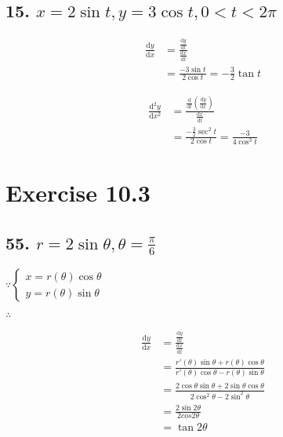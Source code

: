 \documentclass{article}
\begin{document}
    \subsection*{15. $x = 2\sin t, y = 3\cos t, 0 < t < 2\pi$}

    $$
    \begin{aligned}
        \frac{\mathrm{d}y}{\mathrm{d}x} &= \frac{\frac{\mathrm{d}y}{\mathrm{d}t}}{\frac{\mathrm{d}x}{\mathrm{d}t}} \\
        &= \frac{-3\sin t }{2\cos t} = -\frac 3 2 \tan t
    \end{aligned}
    $$

    $$
    \begin{aligned}
        \frac{\mathrm{d^2}y}{\mathrm{d}x^2} &= \frac{\frac{\mathrm{d}}{\mathrm{d}t} (\frac{\mathrm{d}y}{\mathrm{d}x})}{\frac{\mathrm{d}x}{\mathrm{d}t}} \\
        &= \frac{-\frac 3 2 \sec ^2 t}{2 \cos t} = \frac{-3}{4\cos ^3 t}
    \end{aligned}
    $$

    \section*{Exercise 10.3}

    \subsection*{55. $r = 2\sin \theta, \theta = \frac \pi 6$}

    $\because \left\{ \begin{array}{ll}
        x = r(\theta) \cos \theta \\
        y = r(\theta) \sin \theta
    \end{array} \right.$

    $\therefore$ 
    
    $$\begin{aligned}
        \frac{\mathrm{d}y}{\mathrm{d}x} &= \frac{\frac{\mathrm{d}y}{\mathrm{d}t}}{\frac{\mathrm{d}x}{\mathrm{d}t}} \\
        &= \frac{r'(\theta) \sin \theta + r(\theta) \cos \theta}{r'(\theta) \cos \theta - r(\theta) \sin \theta} \\
        &= \frac{2 \cos \theta \sin \theta + 2 \sin \theta \cos \theta}{2 \cos ^2\theta - 2\sin ^2\theta} \\
        &= \frac{2\sin 2\theta}{2cos 2\theta} \\
        &= \tan 2\theta
    \end{aligned}$$
\end{document}
